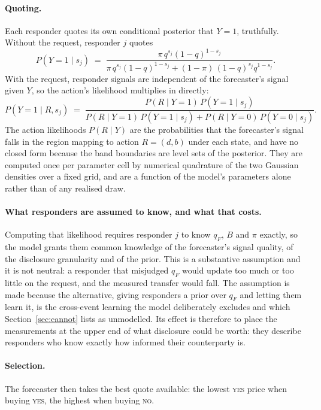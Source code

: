 \paragraph{Quoting.} Each responder quotes its own conditional posterior that $Y=1$,
truthfully. Without the request, responder $j$ quotes
\[
P(Y{=}1 \mid s_j) \;=\; \frac{\pi\,q^{s_j}(1-q)^{1-s_j}}
{\pi\,q^{s_j}(1-q)^{1-s_j} + (1-\pi)\,(1-q)^{s_j}q^{1-s_j}} .
\]
With the request, responder signals are independent of the forecaster's signal given $Y$, so
the action's likelihood multiplies in directly:
\[
P(Y{=}1 \mid R, s_j) \;=\;
\frac{P(R \mid Y{=}1)\,P(Y{=}1 \mid s_j)}
{P(R \mid Y{=}1)\,P(Y{=}1 \mid s_j) + P(R \mid Y{=}0)\,P(Y{=}0 \mid s_j)} .
\]
The action likelihoods $P(R \mid Y)$ are the probabilities that the forecaster's signal falls
in the region mapping to action $R = (d,b)$ under each state, and have no closed form because
the band boundaries are level sets of the posterior. They are computed once per parameter
cell by numerical quadrature of the two Gaussian densities over a fixed grid, and are a
function of the model's parameters alone rather than of any realised draw.

\paragraph{What responders are assumed to know, and what that costs.} Computing that
likelihood requires responder $j$ to know $q_F$, $B$ and $\pi$ exactly, so the model grants
them common knowledge of the forecaster's signal quality, of the disclosure granularity and
of the prior. This is a substantive assumption and it is not neutral: a responder that
misjudged $q_F$ would update too much or too little on the request, and the measured transfer
would fall. The assumption is made because the alternative, giving responders a prior over
$q_F$ and letting them learn it, is the cross-event learning the model deliberately excludes
and which Section~\ref{sec:cannot} lists as unmodelled. Its effect is therefore to place the
measurements at the upper end of what disclosure could be worth: they describe responders who
know exactly how informed their counterparty is.

\paragraph{Selection.} The forecaster then takes the best quote available: the lowest \textsc{yes} price when buying
\textsc{yes}, the highest when buying \textsc{no}.

